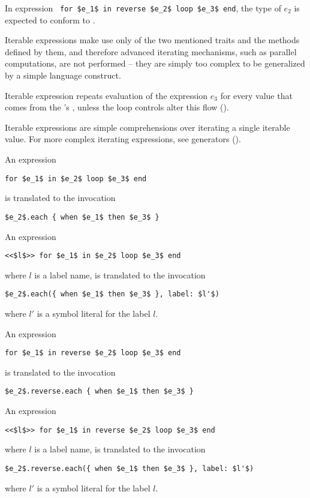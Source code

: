 In expression ~\lstinline!for $e_1$ in reverse $e_2$ loop $e_3$ end!, the type of $e_2$ is expected to conform to . 

Iterable expressions make use only of the two mentioned traits and the methods defined by them, and therefore advanced iterating mechanisms, such as parallel computations, are not performed -- they are simply too complex to be generalized by a simple language construct. 

Iterable expression repeats evaluation of the expression $e_3$ for every value that comes from the 's , unless the loop controls alter this flow ().

Iterable expressions are simple comprehensions over iterating a single iterable value. For more complex iterating expressions, see generators ().

An expression 
\begin{lstlisting}
for $e_1$ in $e_2$ loop $e_3$ end
\end{lstlisting} 
is translated to the invocation
\begin{lstlisting}
$e_2$.each { when $e_1$ then $e_3$ }
\end{lstlisting} 

An expression 
\begin{lstlisting}
<<$l$>> for $e_1$ in $e_2$ loop $e_3$ end
\end{lstlisting} 
where $l$ is a label name, is translated to the invocation
\begin{lstlisting}[deletekeywords={label}]
$e_2$.each({ when $e_1$ then $e_3$ }, label: $l'$)
\end{lstlisting}
where $l'$ is a symbol literal for the label $l$. 

An expression 
\begin{lstlisting}
for $e_1$ in reverse $e_2$ loop $e_3$ end
\end{lstlisting} 
is translated to the invocation
\begin{lstlisting}[deletekeywords={reverse}]
$e_2$.reverse.each { when $e_1$ then $e_3$ }
\end{lstlisting} 

An expression 
\begin{lstlisting}
<<$l$>> for $e_1$ in reverse $e_2$ loop $e_3$ end
\end{lstlisting} 
where $l$ is a label name, is translated to the invocation
\begin{lstlisting}[deletekeywords={label,reverse}]
$e_2$.reverse.each({ when $e_1$ then $e_3$ }, label: $l'$)
\end{lstlisting}
where $l'$ is a symbol literal for the label $l$. 

